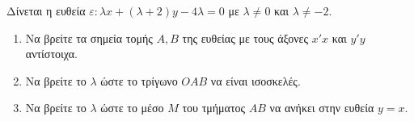 \documentclass[11pt,a4paper,modern]{FFExercises}
\begin{document}
\askhsh
Δίνεται η ευθεία $ \varepsilon: \lambda x + (\lambda+2)y - 4\lambda = 0 $ με $ \lambda \neq 0 $ και $ \lambda \neq -2 $.
\begin{enumerate}[itemsep=0mm,label=\alph*.]
	\item Να βρείτε τα σημεία τομής $ A, B $ της ευθείας με τους άξονες $ x'x $ και $ y'y $ αντίστοιχα.
	\item Να βρείτε το $ \lambda $ ώστε το τρίγωνο $ OAB $ να είναι ισοσκελές.
	\item Να βρείτε το $ \lambda $ ώστε το μέσο $ M $ του τμήματος $ AB $ να ανήκει στην ευθεία $ y = x $.
\end{enumerate}
\end{document}
